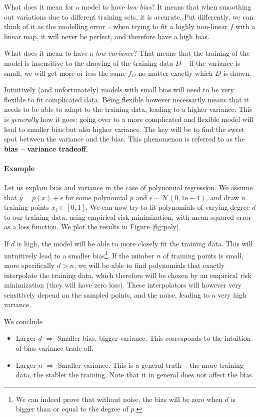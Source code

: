 \documentclass{article}
\begin{document}
What does it mean for a model to have \emph{low bias}? It means that when smoothing out variations due to different training sets, it is accurate. Put differently, we can think of it as the modelling error -- when trying to fit a highly non-linear $f$ with a linear map, it will never be perfect, and therefore have a high bias. 

What does it mean to have a \emph{low variance}? That means that the training of the model is insensitive to the drawing of the training data $D$ -- if the variance is small, we will get more or less the same $f_D$ no matter exactly which $D$ is drawn.

Intuitively (and unfortunately) models with small bias will need to be very flexible to fit complicated data. Being flexible however necessarily means that it needs to be able to adapt to the training data, leading to a higher variance. This is \emph{generally} how it goes: going over to a more complicated and flexible model will lead to smaller bias but also higher variance. The key will be to find the sweet spot between the variance and the bias. This phenomenon is referred to as the \textbf{bias -- variance  tradeoff}.

\paragraph{Example} Let us explain bias and variance in the case of polynomial regression. We assume that $y=p(x)+\epsilon$ for some polynomial $p$ and $\epsilon \sim \mathcal{N}(0,1\mathrm{e-4})$, and draw $n$ training points $x_i \in [0,1]$. We can now try to fit polynomials of varying degree $d$ to our training data, using empirical risk minimization, with mean squared error as a loss function. We plot the results in Figure \ref{fig:poly}.

If $d$ is high, the model will be able to more closely fit the training data. This will untuitively lead to a smaller bias\footnote{We can indeed prove that without noise, the bias will be zero when $d$ is bigger than or equal to the degree of $p$.}. If the number $n$ of training points is small, more specifically $d>n$, we will be able to find polynomials that exactly interpolate the training data, which therefore will be chosen by an empirical risk minimization (they will have zero loss). These interpolators will however very sensitively depend on the sampled points, and the noise, leading to a very high variance.

We conclude
\begin{itemize}
    \item Larger $d$ $\Rightarrow$ Smaller bias, bigger variance. This corresponds to the intuition of bias-variance trade-off.
    \item Larger $n$ $\Rightarrow$ Smaller variance. This is a general truth -- the more training data, the stabler the training. Note that it in general does not affect the bias.
\end{itemize}
\end{document}
